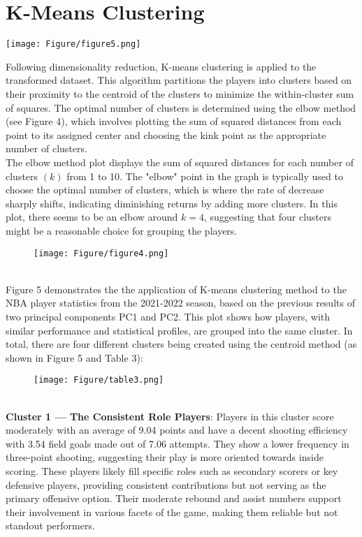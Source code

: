 \documentclass[fleqn,10pt]{SelfArx} %
\begin{document}
\section*{K-Means Clustering}
\begin{figure*}[ht]
    \centering
    \texttt{[image: Figure/figure5.png]}
    \label{fig:enter-label}
\end{figure*}
Following dimensionality reduction, K-means clustering is applied to the transformed dataset. This algorithm partitions the players into clusters based on their proximity to the centroid of the clusters to minimize the within-cluster sum of squares. The optimal number of clusters is determined using the elbow method (see Figure 4), which involves plotting the sum of squared distances from each point to its assigned center and choosing the kink point as the appropriate number of clusters.\\
The elbow method plot displays the sum of squared distances for each number of clusters $(k)$ from 1 to 10. The "elbow" point in the graph is typically used to choose the optimal number of clusters, which is where the rate of decrease sharply shifts, indicating diminishing returns by adding more clusters. In this plot, there seems to be an elbow around $k = 4$, suggesting that four clusters might be a reasonable choice for grouping the players.\\
\begin{figure}[ht]
    \centering
    \texttt{[image: Figure/figure4.png]}
    \label{fig:enter-label}
\end{figure}\\
Figure 5 demonstrates the the application of K-means clustering method to the NBA player statistics from the 2021-2022 season, based on the previous results of two principal components PC1 and PC2. This plot shows how players, with similar performance and statistical profiles, are grouped into the same cluster. In total, there are four different clusters being created using the centroid method (as shown in Figure 5 and Table 3): \\
\begin{figure}[ht]
    \centering
    \texttt{[image: Figure/table3.png]}
    \label{fig:enter-label}
\end{figure}\\
\textbf{Cluster 1 --- The Consistent Role Players}: Players in this cluster score moderately with an average of 9.04 points and have a decent shooting efficiency with 3.54 field goals made out of 7.06 attempts. They show a lower frequency in three-point shooting, suggesting their play is more oriented towards inside scoring. These players likely fill specific roles such as secondary scorers or key defensive players, providing consistent contributions but not serving as the primary offensive option. Their moderate rebound and assist numbers support their involvement in various facets of the game, making them reliable but not standout performers.\\
\end{document}
